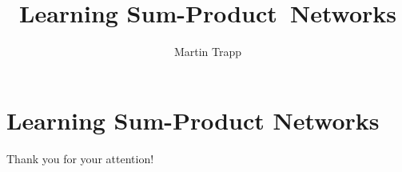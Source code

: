 \documentclass{beamer}
\title[Sum-Product Networks] { Learning Sum-Product~Networks }
\author { Martin Trapp }
\date{}
\begin{document}
\maketitle






\section{Learning Sum-Product Networks}







\begin{frame}{}

\centering
Thank you for your attention!

\end{frame}
\end{document}
